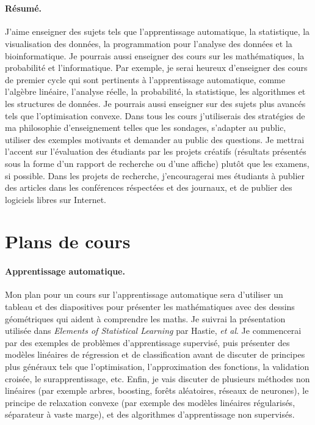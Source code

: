 \documentclass{article}
\begin{document}
 \mbox{ }


\paragraph{Résumé.} J'aime enseigner des sujets tels que
l'apprentissage automatique, la statistique, la visualisation des
données, la programmation pour l'analyse des données et la
bioinformatique. Je pourrais aussi enseigner des cours sur les
mathématiques, la probabilité et l'informatique. Par exemple, je serai
heureux d'enseigner des cours de premier cycle qui sont pertinents à
l'apprentissage automatique, comme l'algèbre linéaire, l'analyse
réelle, la probabilité, la statistique, les algorithmes et les
structures de données. Je pourrais aussi enseigner sur des sujets plus
avancés tels que l'optimisation convexe. Dans tous les cours
j'utiliserais des stratégies de ma philosophie d'enseignement telles
que les sondages, s'adapter au public, utiliser des exemples motivants
et demander au public des questions. Je mettrai l'accent sur
l'évaluation des étudiants par les projets créatifs (résultats
présentés sous la forme d'un rapport de recherche ou d'une affiche)
plutôt que les examens, si possible. Dans les projets de recherche,
j'encouragerai mes étudiants à publier des articles dans les
conférences réspectées et des journaux, et de publier des logiciels
libres sur Internet.

\section{Plans de cours}

\paragraph{Apprentissage automatique.} 
Mon plan pour un cours sur l'apprentissage automatique sera d'utiliser
un tableau et des diapositives pour présenter les mathématiques avec
des dessins géométriques qui aident à comprendre les maths. Je suivrai
la présentation utilisée dans \emph{Elements of Statistical Learning}
par Hastie, \emph{et al}. Je commencerai par des exemples de
problèmes d'apprentissage supervisé, puis présenter des modèles
linéaires de régression et de classification avant de discuter de
principes plus généraux tels que l'optimisation, l'approximation des
fonctions, la validation croisée, le surapprentissage, etc. Enfin, je
vais discuter de plusieurs méthodes non linéaires (par exemple arbres,
boosting, forêts aléatoires, réseaux de neurones), le principe de
relaxation convexe (par exemple des modèles linéaires régularisés,
séparateur à vaste marge), et des algorithmes d'apprentissage non
supervisés.
\end{document}

